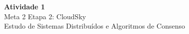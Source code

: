 
\begin{flushleft}
	
\vspace*{15cm}	
\textcolor{projectMainColor}{\textbf{\LARGE Atividade 1}}\\
\textcolor{projectMainColor}{Meta 2 \textbar{} Etapa 2: CloudSky}\\
\vspace*{5cm}	
Estudo de Sistemas Distribuídos e Algoritmos de Consenso

\end{flushleft}
